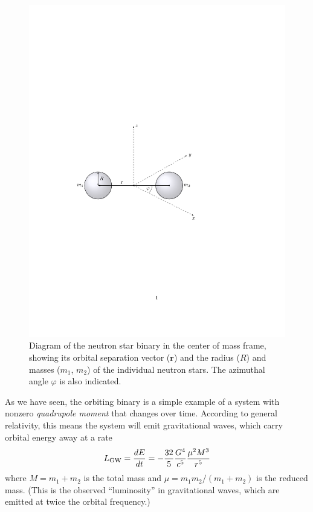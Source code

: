 \documentclass[11pt]{article}
\begin{document}
\begin{figure}[!h]
\begin{mdframed}
\centering
\includegraphics{relativistic_orbit/binary_diagram.pdf}
\caption{\label{fig:binary_diagram}Diagram of the neutron star binary in the center of mass frame, showing its orbital separation vector ($\mathbf{r}$) and the radius ($R$) and masses ($m_1$, $m_2$) of the individual neutron stars. The azimuthal angle $\varphi$ is also indicated.}
\end{mdframed}
\end{figure}

\vspace{10pt}

As we have seen, the orbiting binary is a simple example of a system with nonzero \textit{quadrupole moment} that changes over time. According to general relativity, this means the system will emit gravitational waves, which carry orbital energy away at a rate
\begin{equation}\label{eq:GW_luminosity}
L_{\rm GW} = \frac{dE}{dt} = - \frac{32}{5} \frac{G^4}{c^5} \frac{\mu^2 M^3}{r^5}
\end{equation}
where $M = m_1 + m_2$ is the total mass and $\mu = m_1 m_2/(m_1 + m_2)$ is the reduced mass. (This is the observed ``luminosity'' in gravitational waves, which are emitted at twice the orbital frequency.)
\end{document}
